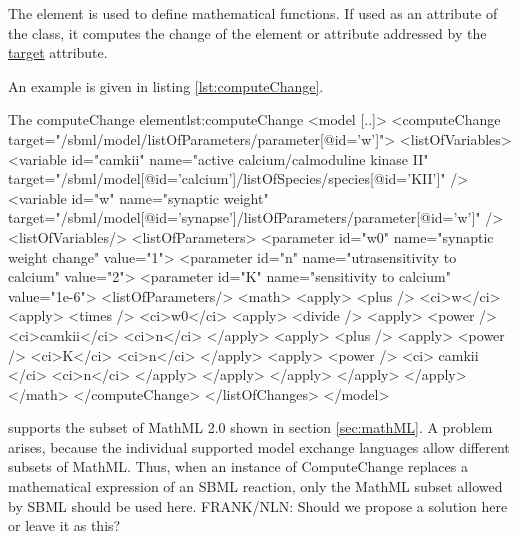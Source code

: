 The  element is used to define mathematical functions. 
If used as an attribute of the  class, it computes the change of the element or attribute addressed by the \hyperref[sec:target]{target} attribute.

An example is given in listing \ref{lst:computeChange}.
%
\begin{myXmlLst}{The computeChange element}{lst:computeChange}
<model [..]>
    <computeChange target="/sbml/model/listOfParameters/parameter[@id='w']">
      <listOfVariables>
        <variable id="camkii" name="active calcium/calmoduline kinase II" 
                  target="/sbml/model[@id='calcium']/listOfSpecies/species[@id='KII']" />
        <variable id="w" name="synaptic weight"
                  target="/sbml/model[@id='synapse']/listOfParameters/parameter[@id='w']" />
      <listOfVariables/>
      <listOfParameters>
        <parameter id="w0" name="synaptic weight change" value="1">
        <parameter id="n" name="utrasensitivity to calcium" value="2">
        <parameter id="K" name="sensitivity to calcium" value="1e-6">
      <listOfParameters/>
      <math>
         <apply>
           <plus />
           <ci>w</ci>
           <apply>
             <times />
             <ci>w0</ci>
             <apply>
               <divide />
               <apply>
                 <power />
                 <ci>camkii</ci>
                 <ci>n</ci>
               </apply>
               <apply>
                 <plus />
                 <apply>
                   <power />
                   <ci>K</ci>
                   <ci>n</ci>
                 </apply>
                 <apply>
                   <power />
                   <ci> camkii </ci>
                   <ci>n</ci>
                 </apply>
               </apply>
             </apply>
           </apply> 
         </apply>
      </math>
    </computeChange>
  </listOfChanges>
</model>
\end{myXmlLst}

\LoneVone supports the subset of MathML 2.0 shown in section \ref{sec:mathML}.
%
A problem arises, because the individual supported model exchange languages allow different subsets of MathML. Thus, when an instance of ComputeChange replaces a mathematical expression of  an SBML reaction, only the MathML subset allowed by SBML should be used here.
\alert{FRANK/NLN: Should we propose a solution here or leave it as this?}



